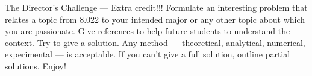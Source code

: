 \documentclass[makesolutionspdf]{esg8022pset}
\begin{document}
\begin{problem}{The Director's Challenge --- Extra credit!!!}
  Formulate an interesting problem that relates a topic from 8.022 to your
  intended major or any other topic about which you are passionate.  Give references
  to help future students to understand the context.  Try to give a solution.
  Any method --- theoretical, analytical, numerical, experimental --- is acceptable.
  If you can't give a full solution, outline partial solutions. Enjoy!
\end{problem}
\end{document}
